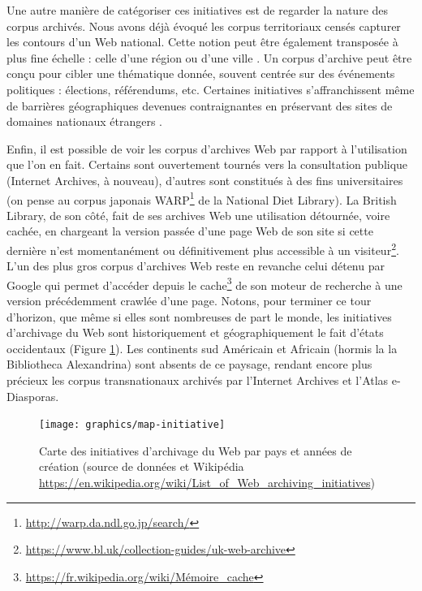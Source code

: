 \documentclass[symmetric,justified,marginals=raggedouter]{tufte-book}
\begin{document}
Une autre manière de catégoriser ces initiatives est de regarder la nature des corpus archivés. Nous avons déjà évoqué les corpus territoriaux censés capturer les contours d'un Web national. Cette notion peut être également transposée à plus fine échelle : celle d'une région ou d'une ville \citep{boudrez_archiving_2002}. Un corpus d'archive peut être conçu pour cibler une thématique donnée, souvent  centrée sur des événements politiques \citep{voerman_archiving_2002,schneider_building_2003} : élections, référendums, etc. Certaines initiatives s'affranchissent même de barrières géographiques devenues contraignantes en préservant des sites de domaines nationaux étrangers \citep{gomes_introducing_2009}.

Enfin, il est possible de voir les corpus d'archives Web par rapport à l'utilisation que l'on en fait. Certains sont ouvertement tournés vers la consultation publique (Internet Archives, à nouveau), d'autres sont constitués à des fins universitaires (on pense au corpus japonais WARP\footnote{\url{http://warp.da.ndl.go.jp/search/}} de la National Diet Library). La British Library, de son côté, fait de ses archives Web une utilisation détournée, voire cachée, en chargeant la version passée d'une page Web de son site si cette dernière n'est momentanément ou définitivement plus accessible à un visiteur\footnote{\url{https://www.bl.uk/collection-guides/uk-web-archive}}. L'un des plus gros corpus d'archives Web reste en revanche celui détenu par Google qui permet d'accéder depuis le cache\footnote{\url{https://fr.wikipedia.org/wiki/Mémoire_cache}} de son moteur de recherche à une version précédemment crawlée d'une page. Notons, pour terminer ce tour d'horizon, que même si elles sont nombreuses de part le monde, les initiatives d'archivage du Web sont historiquement et géographiquement le fait d'états occidentaux (Figure \ref{fig:map-initiative}). Les continents sud Américain et Africain (hormis la la Bibliotheca Alexandrina) sont absents de ce paysage, rendant encore plus précieux les corpus transnationaux archivés par l'Internet Archives et l'Atlas e-Diasporas.  


\begin{figure}%
  \texttt{[image: graphics/map-initiative]}
  \caption{Carte des initiatives d'archivage du Web par pays et années de création (source de données \citep{gomes_survey_2011} et Wikipédia \url{https://en.wikipedia.org/wiki/List_of_Web_archiving_initiatives})}
  \label{fig:map-initiative}
\end{figure} 
\end{document}
